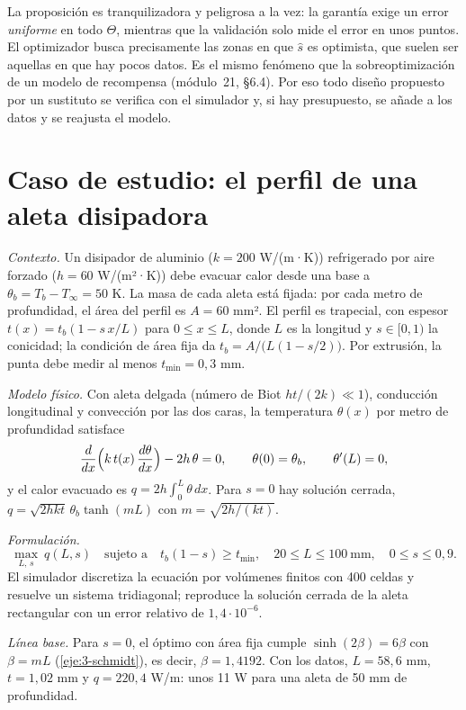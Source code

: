 La proposición es tranquilizadora y peligrosa a la vez: la garantía exige un error \emph{uniforme} en todo $\Theta$, mientras que la validación solo mide el error en unos puntos. El optimizador busca precisamente las zonas en que $\hat s$ es optimista, que suelen ser aquellas en que hay pocos datos. Es el mismo fenómeno que la sobreoptimización de un modelo de recompensa (módulo~21, §6.4). Por eso todo diseño propuesto por un sustituto se verifica con el simulador y, si hay presupuesto, se añade a los datos y se reajusta el modelo.

\section{Caso de estudio: el perfil de una aleta disipadora}

\begin{ejemplo}\label{ej:aleta}
\emph{Contexto.} Un disipador de aluminio ($k=200$ W/(m·K)) refrigerado por aire forzado ($h=60$ W/(m²·K)) debe evacuar calor desde una base a $\theta_b=T_b-T_\infty=50$ K. La masa de cada aleta está fijada: por cada metro de profundidad, el área del perfil es $A=60$ mm². El perfil es trapecial, con espesor $t(x)=t_b(1-s\,x/L)$ para $0\le x\le L$, donde $L$ es la longitud y $s\in[0,1)$ la conicidad; la condición de área fija da $t_b=A/\bigl(L(1-s/2)\bigr)$. Por extrusión, la punta debe medir al menos $t_{\min}=0{,}3$ mm.

\emph{Modelo físico.} Con aleta delgada (número de Biot $ht/(2k)\ll 1$), conducción longitudinal y convección por las dos caras, la temperatura $\theta(x)$ por metro de profundidad satisface~\cite{incropera}
\[
\frac{d}{dx}\Bigl(k\,t(x)\,\frac{d\theta}{dx}\Bigr)-2h\,\theta=0,\qquad \theta(0)=\theta_b,\qquad \theta'(L)=0,
\]
y el calor evacuado es $q=2h\int_0^L\theta\,dx$. Para $s=0$ hay solución cerrada, $q=\sqrt{2hkt}\,\theta_b\tanh(mL)$ con $m=\sqrt{2h/(kt)}$.

\emph{Formulación.}
\[
\max_{L,\,s}\ q(L,s)\quad\text{sujeto a}\quad t_b(1-s)\ge t_{\min},\quad 20\le L\le 100\ \text{mm},\quad 0\le s\le 0{,}9 .
\]
El simulador discretiza la ecuación por volúmenes finitos con 400 celdas y resuelve un sistema tridiagonal; reproduce la solución cerrada de la aleta rectangular con un error relativo de $1{,}4\cdot 10^{-6}$.

\emph{Línea base.} Para $s=0$, el óptimo con área fija cumple $\sinh(2\beta)=6\beta$ con $\beta=mL$ (\cref{eje:3-schmidt}), es decir, $\beta=1{,}4192$. Con los datos, $L=58{,}6$ mm, $t=1{,}02$ mm y $q=220{,}4$ W/m: unos 11 W para una aleta de 50 mm de profundidad.


\end{ejemplo}
